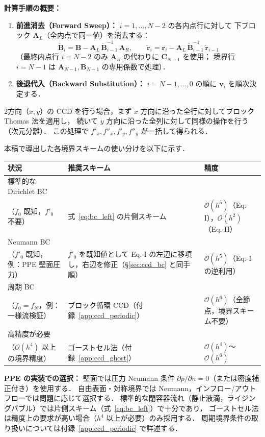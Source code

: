 \textbf{計算手順の概要：}
\begin{enumerate}
  \item \textbf{前進消去（Forward Sweep）：} $i = 1, \dots, N-2$ の各内点行に対して
        下ブロック $\mathbf{A}_L$（全内点で同一値）を消去する：
        \[
          \tilde{\mathbf{B}}_i = \mathbf{B} - \mathbf{A}_L\,\tilde{\mathbf{B}}_{i-1}^{-1}\,\mathbf{A}_R,
          \qquad
          \tilde{\mathbf{r}}_i = \mathbf{r}_i - \mathbf{A}_L\,\tilde{\mathbf{B}}_{i-1}^{-1}\,\tilde{\mathbf{r}}_{i-1}
        \]
        （最終内点行 $i=N-2$ のみ $\mathbf{A}_R$ の代わりに $\mathbf{C}_{N-1}$ を使用；
        境界行 $i=N-1$ は $\mathbf{A}_{N-1}, \mathbf{B}_{N-1}$ の専用係数で処理）．
  \item \textbf{後退代入（Backward Substitution）：} $i = N-1, \dots, 0$ の順に $\bm{v}_i$ を順次決定する．
\end{enumerate}

2方向（$x, y$）の CCD を行う場合，まず $x$ 方向に沿った全行に対してブロック Thomas 法を適用し，
続いて $y$ 方向に沿った全列に対して同様の操作を行う（次元分離）．
この処理で $f'_x, f''_x, f'_y, f''_y$ が一括して得られる．

\begin{tcolorbox}[mybox, title={境界スキーム選択ガイド}]
\label{box:ccd_bc_guide}
本稿で導出した各境界スキームの使い分けを以下に示す．

\medskip
\begin{tabular}{p{38mm}p{38mm}p{38mm}}
\hline
\textbf{状況} & \textbf{推奨スキーム} & \textbf{精度} \\
\hline
標準的な Dirichlet BC \\（$f_0$ 既知，$f'_0$ 不要） &
式~\eqref{eq:bc_left} の片側スキーム &
$\mathcal{O}(h^5)$（Eq.-I），$\mathcal{O}(h^2)$（Eq.-II） \\[4pt]
Neumann BC \\（$f'_0$ 既知，例：PPE 壁面圧力） &
$f'_0$ を既知値として Eq.-I の左辺に移項し，右辺を修正（§\ref{sec:ccd_bc} と同手順） &
$\mathcal{O}(h^5)$（Eq.-I の逆利用） \\[4pt]
周期 BC \\（$f_0 = f_N$，例：一様流検証） &
ブロック循環 CCD（付録~\ref{app:ccd_periodic}） &
$\mathcal{O}(h^6)$（全節点，境界スキーム不要） \\[4pt]
高精度が必要 \\（$\mathcal{O}(h^4)$ 以上の境界精度） &
ゴーストセル法（付録~\ref{app:ccd_ghost}） &
$\mathcal{O}(h^4)$〜$\mathcal{O}(h^6)$ \\
\hline
\end{tabular}

\medskip
\textbf{PPE の実装での選択：}
壁面では圧力 Neumann 条件 $\partial p/\partial n = 0$（または密度補正付き）を使用する．
自由表面・対称境界では Neumann，インフロー/アウトフローでは問題に応じて選択する．
標準的な閉容器流れ（静止液滴，ライジングバブル）では片側スキーム（式~\eqref{eq:bc_left}）で十分であり，
ゴーストセル法は精度上の要求が高い場合（$h^4$ 以上が必要）のみ採用する．
周期境界条件の取り扱いについては付録~\ref{app:ccd_periodic} で詳述する．
\end{tcolorbox}

